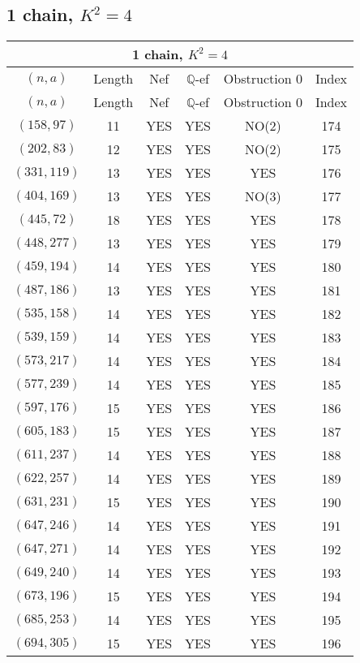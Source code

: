 \subsection{1 chain, $K^2 = 4$}
\begin{longtable}{|c|c|c|c|c|c|}
\hline
\multicolumn{6}{|c|}{1 chain, $K^2 = 4$}\\
\hline
$(n,a)$ & Length & Nef & $\mathbb Q$-ef & Obstruction 0 & Index\\
\hline
\endfirsthead

\hline
$(n,a)$ & Length & Nef & $\mathbb Q$-ef & Obstruction 0 & Index\\
\hline
\endhead
\hline
\endfoot

$(158, 97)$ & 11 & YES & YES & NO(2) & 174\\
$(202, 83)$ & 12 & YES & YES & NO(2) & 175\\
$(331, 119)$ & 13 & YES & YES & YES & 176\\
$(404, 169)$ & 13 & YES & YES & NO(3) & 177\\
$(445, 72)$ & 18 & YES & YES & YES & 178\\
$(448, 277)$ & 13 & YES & YES & YES & 179\\
$(459, 194)$ & 14 & YES & YES & YES & 180\\
$(487, 186)$ & 13 & YES & YES & YES & 181\\
$(535, 158)$ & 14 & YES & YES & YES & 182\\
$(539, 159)$ & 14 & YES & YES & YES & 183\\
$(573, 217)$ & 14 & YES & YES & YES & 184\\
$(577, 239)$ & 14 & YES & YES & YES & 185\\
$(597, 176)$ & 15 & YES & YES & YES & 186\\
$(605, 183)$ & 15 & YES & YES & YES & 187\\
$(611, 237)$ & 14 & YES & YES & YES & 188\\
$(622, 257)$ & 14 & YES & YES & YES & 189\\
$(631, 231)$ & 15 & YES & YES & YES & 190\\
$(647, 246)$ & 14 & YES & YES & YES & 191\\
$(647, 271)$ & 14 & YES & YES & YES & 192\\
$(649, 240)$ & 14 & YES & YES & YES & 193\\
$(673, 196)$ & 15 & YES & YES & YES & 194\\
$(685, 253)$ & 14 & YES & YES & YES & 195\\
$(694, 305)$ & 15 & YES & YES & YES & 196\\

\end{longtable}

